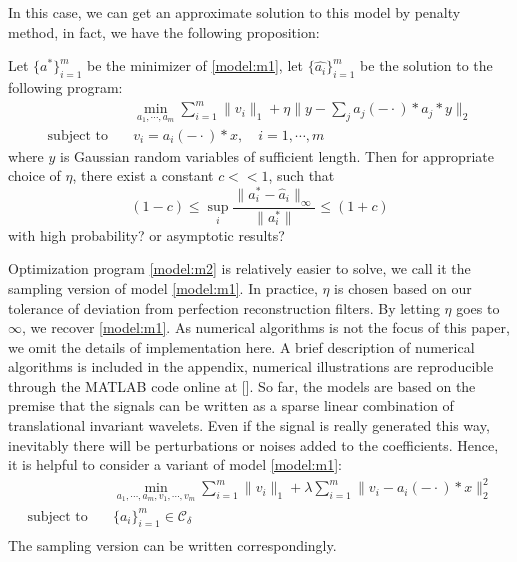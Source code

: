 \documentclass[a4paper]{article}
\begin{document}
In this case, we can get an approximate solution to this model by penalty method, in fact, we have the following proposition:
\begin{prop}
Let $\{a^*\}_{i=1}^m$ be the minimizer of \eqref{model:m1}, let $\{\hat{a_i}\}_{i=1}^m$ be the solution to the following program:
\begin{equation}
	\label{model:m2}
	\begin{aligned}
		&\min_{a_1,\cdots,a_m} \sum_{i=1}^m \|v_i\|_1 + \eta \|y-\sum_j a_j(-\cdot)*a_j*y\|_2 \\
		\textrm{subject to} \quad &v_i = a_i(-\cdot)*x,\quad i=1,\cdots,m
	\end{aligned}
\end{equation}
where $y$ is Gaussian random variables of sufficient length. Then for appropriate choice of $\eta$, there exist a constant $c<<1$, such that 
	\[
	(1-c)\leq \sup_i \frac{\|a^*_i - \hat{a}_i\|_\infty}{\|a^*_i\|}\leq (1+c)
	\]
{\color{red} with high probability? or asymptotic results?}
\end{prop}
Optimization program \eqref{model:m2} is relatively easier to solve, we call it the sampling version of model \eqref{model:m1}. In practice, $\eta$ is chosen based on our tolerance of deviation from perfection reconstruction filters. By letting $\eta$ goes to $\infty$, we recover \eqref{model:m1}.  As numerical algorithms is not the focus of this paper, we omit the details of implementation here. A brief description of numerical algorithms is included in the appendix, numerical illustrations are reproducible through the MATLAB code online at [].
So far, the models are based on the premise that the signals can be written as a sparse linear combination of translational invariant wavelets. Even if the signal is really generated this way, inevitably there will be perturbations or noises added to the coefficients. Hence, it is helpful to consider a variant of model \eqref{model:m1}:
\begin{equation}
\label{model:m3}
	\begin{aligned}
		&\min_{a_1,\cdots,a_m,v_1,\cdots,v_m} \sum_{i=1}^m \|v_i\|_1  + \lambda \sum_{i=1}^m \|v_i - a_i(-\cdot)*x\|_2^2\\
		\textrm{subject to} \quad& \{a_i\}_{i=1}^m \in \mathcal{C_\delta} \\		 
	\end{aligned}
\end{equation}
The sampling version can be written correspondingly.
\end{document}
